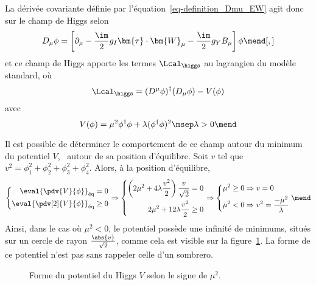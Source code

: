 \par La dérivée covariante définie par l'équation~\eqref{eq-definition_Dmu_EW} agit donc sur le champ de Higgs selon
\begin{equation}
D_\mu \phi = \left[ \partial_\mu - \frac{\im}{2}g_I \bm{\tau}\cdot\bm{W}_\mu - \frac{\im}{2}g_YB_\mu \right] \phi
\mend[,]
\end{equation}
et ce champ de Higgs apporte les termes $\Lcal_{\higgs}$ au lagrangien du modèle standard, où
\begin{equation}
\Lcal_{\higgs} = (D^\mu\phi)^\dagger(D_\mu\phi) - V(\phi)
\end{equation}
avec
\begin{equation}
V(\phi)
= \mu^2\phi^\dagger\phi + \lambda (\phi^\dagger\phi)^2
\msep \lambda > 0
\mend
\label{eq-chapter-MS-MSSM-section-formalisme-subsec-Higgs_mechanism-SM_Higgs_potential}
\end{equation}
\par Il est possible de déterminer le comportement de ce champ autour du minimum du potentiel $V$, \ie\ autour de sa position d'équilibre.
Soit $v$ tel que $v^2=\phi_1^2+\phi_2^2+\phi_3^2+\phi_4^2$.
Alors, à la position d'équilibre,
\begin{equation}
\left\lbrace
\begin{aligned}
\eval{\pdv{V}{\phi}}_\text{éq}=0
\\
\eval{\pdv[2]{V}{\phi}}_\text{éq}\geq0
\end{aligned}
\right.
\Rightarrow
\left\lbrace
\begin{aligned}
\left(2\mu^2 + 4\lambda \frac{v^2}{2}\right) \frac{v}{\sqrt{2}} = 0
\\
2\mu^2 + 12\lambda \frac{v^2}{2} \geq0
\end{aligned}
\right.
\Rightarrow
\left\lbrace
\begin{aligned}
\mu^2 \geq 0 &\Rightarrow v = 0
\\
\mu^2 < 0 &\Rightarrow v^2 = \frac{-\mu^2}{\lambda}
\end{aligned}
\right.
\mend
\end{equation}
Ainsi, dans le cas où $\mu^2<0$, le potentiel possède une infinité de minimums, situés sur un cercle de rayon $\frac{\abs{v}}{\sqrt{2}}$, comme cela est visible sur la figure~\ref{fig-rpztation_3d_V_Higgs}. La forme de ce potentiel n'est pas sans rappeler celle d'un sombrero.
\begin{figure}[h]
\centering

\caption{Forme du potentiel du Higgs $V$ selon le signe de $\mu^2$.}
\label{fig-rpztation_3d_V_Higgs}
\end{figure}
